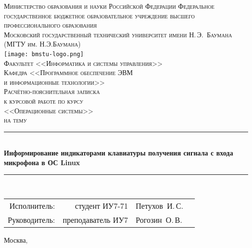 \newcommand{\HRule}{\rule{\linewidth}{0.5mm}}

\begin{center}

\textsc{Министерство образования и науки Российской Федерации
Федеральное государственное бюджетное образовательное учреждение 
высшего профессионального образования}\\[0.5cm]

\textsc{\large Московский государственный технический университет имени Н.\,Э.~Баумана}\\
\textsc{(МГТУ им. Н.Э.Баумана)}\\[0.5cm]
\texttt{[image: bmstu-logo.png]}~\\

\textsc{Факультет <<Информатика и системы управления>>}\\
\textsc{Кафедра <<Программное обеспечение ЭВМ\\и информационные технологии>>}\\[1cm]


\textsc{\huge Расчётно-пояснительная записка}\\
\textsc{к курсовой работе по курсу}\\
\textsc{\large<<Операционные системы>>}\\
\textsc{на тему}\\

\HRule \\[0.5cm]
{\huge \bfseries Информирование индикаторами клавиатуры получения сигнала с входа микрофона в ОС Linux}
\HRule \\[0.5cm]

\vfill

\begin{flushright}
  \begin{tabular}{rrlc}
    Исполнитель:  &    студент ИУ7-71 & Петухов~И.\,С.  & \underline{\hspace{3cm}} \\[1cm]
    Руководитель: & преподаватель ИУ7 & Рогозин~О.\,В. & \underline{\hspace{3cm}} \\[1cm]
  \end{tabular}
\end{flushright}

{\large Москва, \the\year}

\end{center}

\newpage
{}